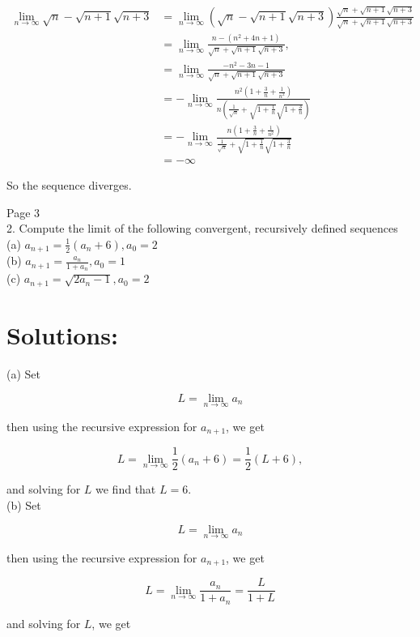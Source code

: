 \documentclass[10pt]{article}
\begin{document}
$$
\begin{aligned}
\lim _{n \rightarrow \infty} \sqrt{n}-\sqrt{n+1} \sqrt{n+3} & =\lim _{n \rightarrow \infty}(\sqrt{n}-\sqrt{n+1} \sqrt{n+3}) \frac{\sqrt{n}+\sqrt{n+1} \sqrt{n+3}}{\sqrt{n}+\sqrt{n+1} \sqrt{n+3}} \\
& =\lim _{n \rightarrow \infty} \frac{n-\left(n^{2}+4 n+1\right)}{\sqrt{n}+\sqrt{n+1} \sqrt{n+3}}, \\
& =\lim _{n \rightarrow \infty} \frac{-n^{2}-3 n-1}{\sqrt{n}+\sqrt{n+1} \sqrt{n+3}} \\
& =-\lim _{n \rightarrow \infty} \frac{n^{2}\left(1+\frac{3}{n}+\frac{1}{n^{2}}\right)}{n\left(\frac{1}{\sqrt{n}}+\sqrt{1+\frac{1}{n}} \sqrt{1+\frac{3}{n}}\right)} \\
& =-\lim _{n \rightarrow \infty} \frac{n\left(1+\frac{3}{n}+\frac{1}{n^{2}}\right)}{\frac{1}{\sqrt{n}}+\sqrt{1+\frac{1}{n}} \sqrt{1+\frac{3}{n}}} \\
& =-\infty
\end{aligned}
$$

So the sequence diverges.

Page 3\\
2. Compute the limit of the following convergent, recursively defined sequences\\
(a) $a_{n+1}=\frac{1}{2}\left(a_{n}+6\right), a_{0}=2$\\
(b) $a_{n+1}=\frac{a_{n}}{1+a_{n}}, a_{0}=1$\\
(c) $a_{n+1}=\sqrt{2 a_{n}-1}, a_{0}=2$

\section*{Solutions:}
(a) Set

$$
L=\lim _{n \rightarrow \infty} a_{n}
$$

then using the recursive expression for $a_{n+1}$, we get

$$
L=\lim _{n \rightarrow \infty} \frac{1}{2}\left(a_{n}+6\right)=\frac{1}{2}(L+6),
$$

and solving for $L$ we find that $L=6$.\\
(b) Set

$$
L=\lim _{n \rightarrow \infty} a_{n}
$$

then using the recursive expression for $a_{n+1}$, we get

$$
L=\lim _{n \rightarrow \infty} \frac{a_{n}}{1+a_{n}}=\frac{L}{1+L}
$$

and solving for $L$, we get
\end{document}
